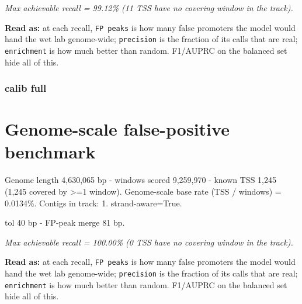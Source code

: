 \documentclass[10pt]{article}
\begin{document}
{\itshape Max achievable recall = 99.12\% (11 TSS have no covering window in the track).}

\textbf{Read as:} at each recall, \texttt{FP peaks} is how many false promoters the model would hand the wet lab genome-wide; \texttt{precision} is the fraction of its calls that are real; \texttt{enrichment} is how much better than random. F1/AUPRC on the balanced set hide all of this.

\subsubsection*{calib \textperiodcentered{} full}
\section*{Genome-scale false-positive benchmark}

Genome length 4,630,065 bp - windows scored 9,259,970 - known TSS 1,245 (1,245 covered by >=1 window). Genome-scale base rate (TSS / windows) = 0.0134\%. Contigs in track: 1. strand-aware=True.

tol 40 bp - FP-peak merge 81 bp.

\begin{center}
\end{center}

{\itshape Max achievable recall = 100.00\% (0 TSS have no covering window in the track).}

\textbf{Read as:} at each recall, \texttt{FP peaks} is how many false promoters the model would hand the wet lab genome-wide; \texttt{precision} is the fraction of its calls that are real; \texttt{enrichment} is how much better than random. F1/AUPRC on the balanced set hide all of this.
\end{document}
